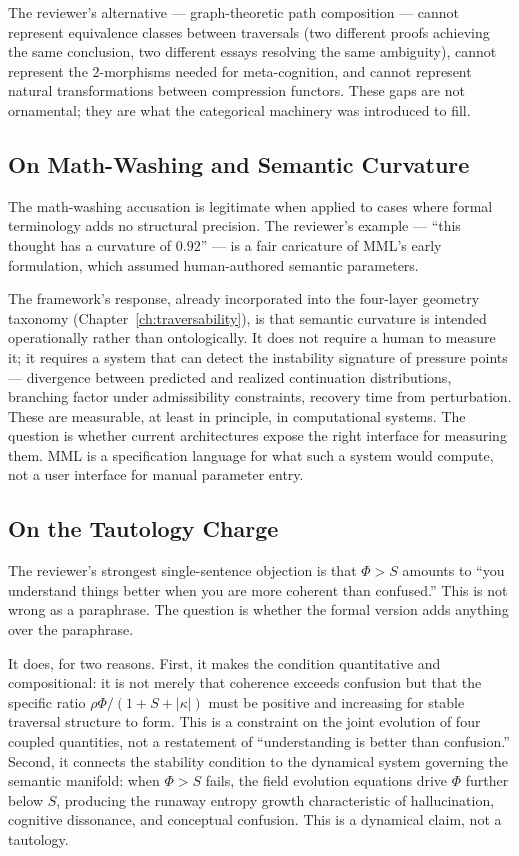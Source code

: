 \documentclass[12pt,oneside]{book}
\theoremstyle{plain}
\theoremstyle{definition}
\theoremstyle{plain}
\begin{document}
The reviewer's alternative — graph-theoretic path composition — cannot represent equivalence classes between traversals (two different proofs achieving the same conclusion, two different essays resolving the same ambiguity), cannot represent the 2-morphisms needed for meta-cognition, and cannot represent natural transformations between compression functors. These gaps are not ornamental; they are what the categorical machinery was introduced to fill.

\subsection{On Math-Washing and Semantic Curvature}

The math-washing accusation is legitimate when applied to cases where formal terminology adds no structural precision. The reviewer's example — ``this thought has a curvature of $0.92$'' — is a fair caricature of MML's early formulation, which assumed human-authored semantic parameters.

The framework's response, already incorporated into the four-layer geometry taxonomy (Chapter~\ref{ch:traversability}), is that semantic curvature is intended operationally rather than ontologically. It does not require a human to measure it; it requires a system that can detect the instability signature of pressure points — divergence between predicted and realized continuation distributions, branching factor under admissibility constraints, recovery time from perturbation. These are measurable, at least in principle, in computational systems. The question is whether current architectures expose the right interface for measuring them. MML is a specification language for what such a system would compute, not a user interface for manual parameter entry.

\subsection{On the Tautology Charge}

The reviewer's strongest single-sentence objection is that $\Phi > S$ amounts to ``you understand things better when you are more coherent than confused.'' This is not wrong as a paraphrase. The question is whether the formal version adds anything over the paraphrase.

It does, for two reasons. First, it makes the condition quantitative and compositional: it is not merely that coherence exceeds confusion but that the specific ratio $\rho\Phi / (1 + S + |\kappa|)$ must be positive and increasing for stable traversal structure to form. This is a constraint on the joint evolution of four coupled quantities, not a restatement of ``understanding is better than confusion.'' Second, it connects the stability condition to the dynamical system governing the semantic manifold: when $\Phi > S$ fails, the field evolution equations drive $\Phi$ further below $S$, producing the runaway entropy growth characteristic of hallucination, cognitive dissonance, and conceptual confusion. This is a dynamical claim, not a tautology.
\end{document}
